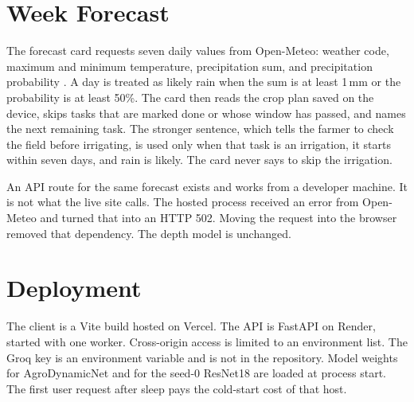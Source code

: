 \section{Week Forecast}
The forecast card requests seven daily values from Open-Meteo: weather code, maximum and minimum temperature, precipitation sum, and precipitation probability \cite{openmeteo}. A day is treated as likely rain when the sum is at least 1\,mm or the probability is at least 50\%. The card then reads the crop plan saved on the device, skips tasks that are marked done or whose window has passed, and names the next remaining task. The stronger sentence, which tells the farmer to check the field before irrigating, is used only when that task is an irrigation, it starts within seven days, and rain is likely. The card never says to skip the irrigation.

An API route for the same forecast exists and works from a developer machine. It is not what the live site calls. The hosted process received an error from Open-Meteo and turned that into an HTTP 502. Moving the request into the browser removed that dependency. The depth model is unchanged.

\section{Deployment}
The client is a Vite build hosted on Vercel. The API is FastAPI on Render, started with one worker. Cross-origin access is limited to an environment list. The Groq key is an environment variable and is not in the repository. Model weights for AgroDynamicNet and for the seed-0 ResNet18 are loaded at process start. The first user request after sleep pays the cold-start cost of that host.
